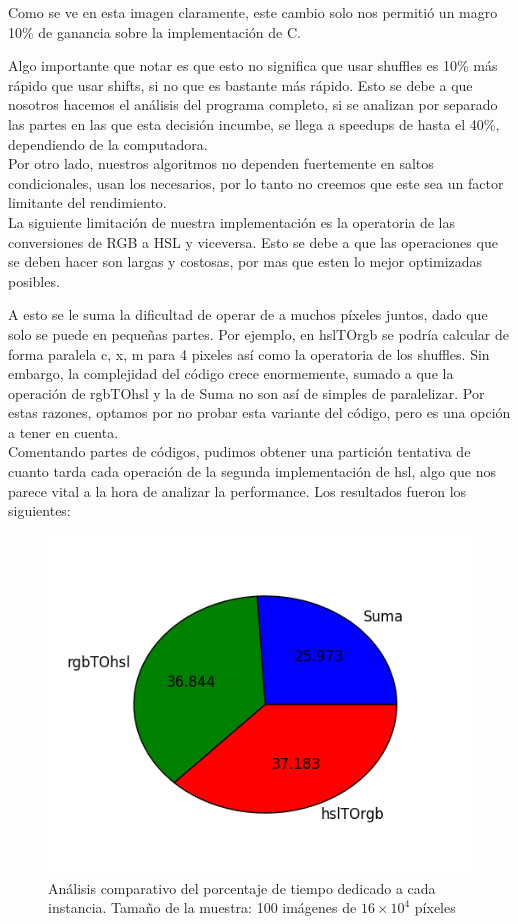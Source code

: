 Como se ve en esta imagen claramente, este cambio solo nos permitió un magro 10\% de ganancia sobre la implementación de C.

Algo importante que notar es que esto no significa que usar shuffles es 10\% más rápido que usar shifts, si no que es bastante más rápido. Esto se debe a que nosotros hacemos el análisis del programa completo, si se analizan por separado las partes en las que esta decisión incumbe, se llega a speedups de hasta el 40\%, dependiendo de la computadora.
\\

Por otro lado, nuestros algoritmos no dependen fuertemente en saltos condicionales, usan los necesarios, por lo tanto no creemos que este sea un factor limitante del rendimiento.
\\

La siguiente limitación de nuestra implementación es la operatoria de las conversiones de RGB a HSL y viceversa. Esto se debe a que las operaciones que se deben hacer son largas y costosas, por mas que esten lo mejor optimizadas posibles.

A esto se le suma la dificultad de operar de a muchos píxeles juntos, dado que solo se puede en pequeñas partes.
Por ejemplo, en hslTOrgb se podría calcular de forma paralela c, x, m para 4 pixeles así como la operatoria de los shuffles.
Sin embargo, la complejidad del código crece enormemente, sumado a que la operación de rgbTOhsl y la de Suma no son así de simples de paralelizar.
Por estas razones, optamos por no probar esta variante del código, pero es una opción a tener en cuenta.
\\

Comentando partes de códigos, pudimos obtener una partición tentativa de cuanto tarda cada operación de la segunda implementación de hsl, algo que nos parece vital a la hora de analizar la performance. Los resultados fueron los siguientes:


\begin{figure}[H] 
	\centering
  \includegraphics[scale=0.7]{hsl-div.png}
  \caption{Análisis comparativo del porcentaje de tiempo dedicado a cada instancia. Tamaño de la muestra: 100 imágenes de $16\times 10^4$ píxeles}
\end{figure}

